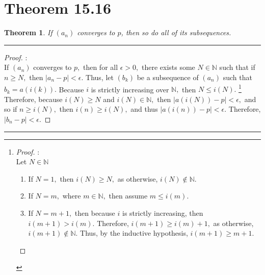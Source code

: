 \documentclass[openany, amssymb, psamsfonts]{amsart}
\newcommand{\bbN}{\mathbb{N}}
\newtheorem{thm}{Theorem}[section]
\theoremstyle{definition}
\numberwithin{equation}{section}
\begin{document}
\section*{Theorem 15.16}
\begin{thm}
	If $(a_n)$ converges to $p$, then so do all of its subsequences.
\end{thm}
\vspace{4pt}     \hrule   \vspace{4pt}\begin{proof}:\\
If $(a_n)$ converges to $p,$ then for all $\epsilon>0,$ there exists some $N \in \bbN$ such that if $n\geq N,$ then $|a_n -p|< \epsilon.$ Thus, let $(b_k)$ be a subsequence of $(a_n)$ such that $b_k = a(i(k)).$ Because $i$ is strictly increasing over $\bbN,$ then $N \leq i(N).$ \footnote{\begin{proof}:\\ Let $N \in \bbN$
    \begin{enumerate}
        \item If $N = 1,$ then $i(N)\geq N,$ as otherwise, $i(N)\notin \bbN.$
        \item If $N = m,$ where $m \in \bbN,$ then assume $m \leq i(m).$
        \item If $N = m+1,$ then because $i$ is strictly increasing, then $i(m+1)> i(m).$ Therefore, $i(m+1)\geq i(m) + 1,$ as otherwise, $i(m+1)\notin \bbN.$ Thus, by the inductive hypothesis, $i(m+1)\geq m+1.$
    \end{enumerate}
\end{proof}} Therefore, because $i(N)\geq N$ and $i(N)\in \bbN,$ then $|a(i(N)) - p|< \epsilon,$ and so if $n\geq i(N),$ then $i(n)\geq i(N),$ and thus $|a(i(n)) - p|< \epsilon.$ Therefore, $|b_n - p|< \epsilon.$
\end{proof}\vspace{4pt}     \hrule   \vspace{4pt}
\end{document}

